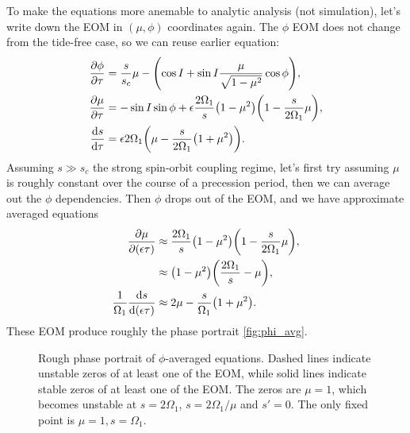 \documentclass[11pt,
        usenames, %
        dvipsnames %
    ]{article}
\newcommand*{\rd}[2]{\frac{\mathrm{d}#1}{\mathrm{d}#2}}
\newcommand*{\pd}[2]{\frac{\partial#1}{\partial#2}}
\DeclarePairedDelimiter\p{\lparen}{\rparen}
\begin{document}
To make the equations more anemable to analytic analysis (not simulation), let's
write down the EOM in $(\mu, \phi)$ coordinates again. The $\phi$ EOM does not
change from the tide-free case, so we can reuse earlier equation:
\begin{align}
    \pd{\phi}{\tau} &= \frac{s}{s_c}\mu
        - \p*{\cos I + \sin I \frac{\mu}{\sqrt{1 - \mu^2}} \cos \phi} ,\\
    \pd{\mu}{\tau} &= -\sin I \sin \phi +
        \epsilon \frac{2\Omega_1}{s}\p*{1 - \mu^2}
            \p*{1 - \frac{s}{2\Omega_1}\mu},\\
    \rd{s}{\tau}
        &= \epsilon 2\Omega_1 \p*{\mu - \frac{s}{2\Omega_1}\p*{1 + \mu^2}}.
\end{align}
Assuming $s \gg s_c$ the strong spin-orbit coupling regime, let's first try
assuming $\mu$ is roughly constant over the course of a precession period, then
we can average out the $\phi$ dependencies. Then $\phi$ drops out of the EOM,
and we have approximate averaged equations
\begin{subequations}\label{se:prec_avg}
    \begin{align}
        \pd{\mu}{(\epsilon\tau)} &\approx \frac{2\Omega_1}{s}\p*{1 - \mu^2}
                \p*{1 - \frac{s}{2\Omega_1}\mu},\nonumber\\
            &\approx \p*{1 - \mu^2}
                \p*{\frac{2\Omega_1}{s} - \mu},\\
        \frac{1}{\Omega_1}\rd{s}{(\epsilon\tau)}
            &\approx 2\mu - \frac{s}{\Omega_1}\p*{1 + \mu^2}.
    \end{align}
\end{subequations}
These EOM produce roughly the phase portrait \autoref{fig:phi_avg}.
\begin{figure}[t]
    \centering
    \caption{Rough phase portrait of $\phi$-averaged equations. Dashed lines
    indicate unstable zeros of at least one of the EOM, while solid lines
    indicate stable zeros of at least one of the EOM\@. The zeros are $\mu = 1$,
    which becomes unstable at $s = 2\Omega_1$, $s = 2\Omega_1/\mu$ and $s' = 0$.
    The only fixed point is $\mu = 1, s = \Omega_1$.}\label{fig:phi_avg}
\end{figure}
\end{document}
